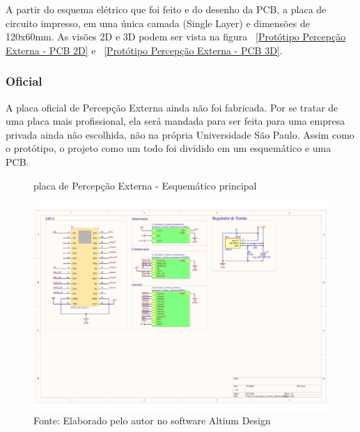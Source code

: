 \documentclass[../poliXuniversity_hospital_-USP-report.tex]{subfiles}
\begin{document}
  A partir do esquema elétrico que foi feito e do desenho da PCB, a placa de circuito impresso, em uma única camada (Single Layer) e dimensões de 120x60mm. As visões 2D e 3D podem ser vista na figura   ~\ref{Protótipo Percepção Externa - PCB 2D} e ~\ref{Protótipo Percepção Externa - PCB 3D}.
  

\clearpage
\subsubsection{Oficial}

A placa oficial de Percepção Externa ainda não foi fabricada. Por se tratar de uma placa mais profissional, ela será mandada para ser feita para uma empresa privada ainda não escolhida, não na própria Universidade São Paulo. Assim como o protótipo, o projeto como um todo foi dividido em um esquemático e uma PCB.

\begin{figure}[!ht]
\centering
    \caption{placa de Percepção Externa - Esquemático principal }
    \centering %
    \includegraphics[width=17cm]{modulos/percepcao_externa_official-1.png}
    \caption*{Fonte: Elaborado pelo autor no software Altium Design\cite{altium21} }
    \label{Protótipo placa de ## - Esquemático principal}
\end{figure}
\end{document}
